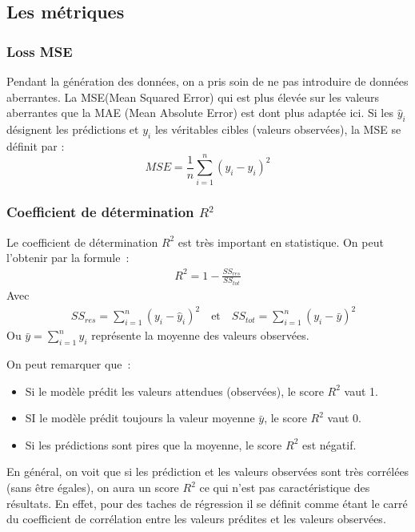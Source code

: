 \subsection{Les métriques}

\subsubsection{Loss MSE}
Pendant la génération des données, on a pris soin de ne pas introduire de données aberrantes. La MSE(Mean Squared Error) qui est plus élevée sur les valeurs aberrantes que la MAE (Mean Absolute Error) est dont plus adaptée ici. Si les $\hat{y}_i$ désignent les prédictions et $y_i$ les véritables cibles (valeurs observées), la MSE se définit par :
\begin{equation}
 MSE = \frac{1}{n} \sum_{i=1}^{n} \left( y_i - \hat{y}_i \right)^2
 \label{eqn:MSE}
\end{equation}

\subsubsection{Coefficient de détermination $R^2$}
\label{subsub:R2}
Le coefficient de détermination $R^2$ est très important en statistique. On peut l'obtenir par la formule :
\begin{align}
 R^2 = 1 - \frac{SS_{res}}{SS_{tot}}
 \label{eqn:R2}
\end{align}
Avec
\begin{align*}
 \quad SS_{res} =  \sum_{i=1}^{n} \left( y_i - \hat{y}_i \right)^2 \quad \text{et} \quad SS_{tot} =  \sum_{i=1}^{n} \left( y_i - \bar{y} \right)^2 
\end{align*}
Ou $ \bar{y} = \sum_{i=1}^{n} y_i $ représente la moyenne des valeurs observées.

On peut remarquer que :
\begin{itemize}
 \item Si le modèle prédit les valeurs attendues (observées), le score $R^2$ vaut 1. 
 \item SI le modèle prédit toujours la valeur moyenne $\bar{y}$, le score $R^2$ vaut 0.
 \item Si les prédictions sont pires que la moyenne, le score $R^2$ est négatif.
\end{itemize}

En général, on voit que si les prédiction et les valeurs observées sont très corrélées (sans être égales), on aura un score $R^2$ ce qui n'est pas caractéristique des résultats. En effet, pour des taches de régression il se définit comme étant le carré du coefficient de corrélation entre les valeurs prédites et les valeurs observées.

